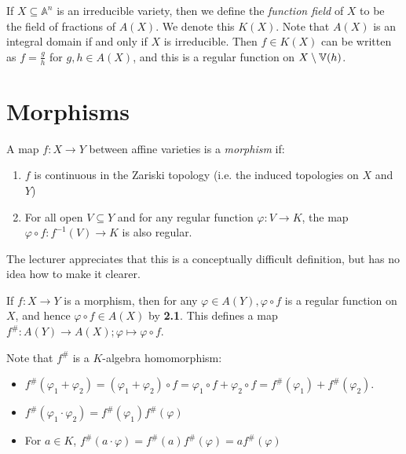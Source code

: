 \documentclass[10pt,a4paper,rgb]{article}
\begin{document}
If $X \subseteq \mathbb{A}^n$ is an irreducible variety, then we define the \emph{function field} of $X$ to be the field of fractions of $A(X)$. We denote this $K(X)$. Note that $A(X)$ is an integral domain if and only if $X$ is irreducible. Then $f \in K(X)$ can be written as $f=\frac{g}{h}$ for $g,h \in A(X)$, and this is a regular function on $X \setminus \mathbb{V}(h)$.

\section{Morphisms}
A map $f:X \to Y$ between affine varieties is a \emph{morphism} if:
\begin{enumerate}
\item $f$ is continuous in the Zariski topology (i.e. the induced topologies on $X$ and $Y$)
\item For all open $V \subseteq Y$ and for any regular function $\varphi: V \to K$, the map $\varphi \circ f: f^{-1}(V) \to K$ is also regular.
\end{enumerate}
The lecturer appreciates that this is a conceptually difficult definition, but has no idea how to make it clearer.

If $f:X \to Y$ is a morphism, then for any $\varphi \in A(Y), \varphi\circ f$ is a regular function on $X$, and hence $\varphi \circ f \in A(X)$ by \textbf{2.1}. This defines a map $f^{\#}:A(Y) \to A(X); \varphi \mapsto \varphi\circ f$.

Note that $f^{\#}$ is a $K$-algebra homomorphism:
\begin{itemize}
\item $f^{\#}(\varphi_1+\varphi_2) = (\varphi_1+\varphi_2)\circ f = \varphi_1 \circ f + \varphi_2 \circ f = f^{\#}(\varphi_1) + f^{\#}(\varphi_2)$.
\item $f^{\#}(\varphi_1\cdot\varphi_2) = f^{\#}(\varphi_1)f^{\#}(\varphi)$
\item For $a \in K$, $f^{\#}(a \cdot \varphi) = f^{\#}(a)f^{\#}(\varphi) = af^{\#}(\varphi)$
\end{itemize}
\end{document}
